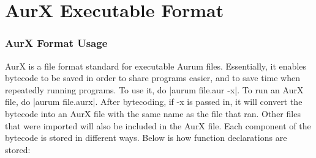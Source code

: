 \documentclass[12pt, letterpaper, oneside]{article}
\begin{document}
	\section{AurX Executable Format}
	\label{misc:aurx}
	\subsubsection{AurX Format Usage}
	AurX is a file format standard for executable Aurum files. Essentially, it enables bytecode to be saved in order to share programs easier, and to save time when repeatedly running programs. To use it, do \spverb|aurum file.aur -x|. To run an AurX file, do \spverb|aurum file.aurx|.
	After bytecoding, if -x is passed in, it will convert the bytecode into an AurX file with the same name as the file that ran. Other files that were imported will also be included in the AurX file. Each component of the bytecode is stored in different ways. Below is how function declarations are stored:
	\newline
\end{document}
